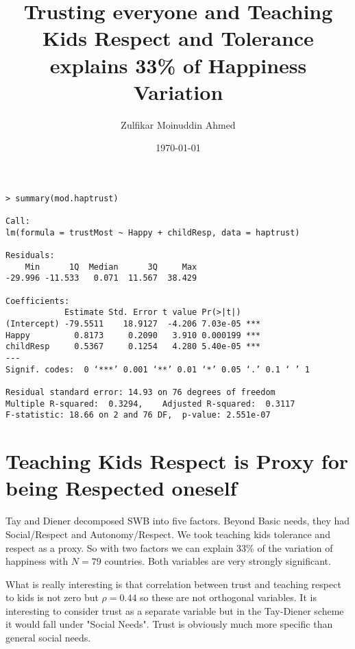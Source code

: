 \documentclass{amsart}
\title{Trusting everyone and Teaching Kids Respect and Tolerance explains 33\% of Happiness Variation}
\author{Zulfikar Moinuddin Ahmed}
\date{\today}
\begin{document}
\maketitle

\begin{verbatim}
> summary(mod.haptrust)

Call:
lm(formula = trustMost ~ Happy + childResp, data = haptrust)

Residuals:
    Min      1Q  Median      3Q     Max 
-29.996 -11.533   0.071  11.567  38.429 

Coefficients:
            Estimate Std. Error t value Pr(>|t|)    
(Intercept) -79.5511    18.9127  -4.206 7.03e-05 ***
Happy         0.8173     0.2090   3.910 0.000199 ***
childResp     0.5367     0.1254   4.280 5.40e-05 ***
---
Signif. codes:  0 ‘***’ 0.001 ‘**’ 0.01 ‘*’ 0.05 ‘.’ 0.1 ‘ ’ 1

Residual standard error: 14.93 on 76 degrees of freedom
Multiple R-squared:  0.3294,	Adjusted R-squared:  0.3117 
F-statistic: 18.66 on 2 and 76 DF,  p-value: 2.551e-07
\end{verbatim}

\section{Teaching Kids Respect is Proxy for being Respected oneself}

Tay and Diener decomposed SWB into five factors.  Beyond Basic needs, they had Social/Respect and Autonomy/Respect.  We took teaching kids tolerance and respect as a proxy.  So with two factors we can explain 33\% of the variation of happiness with $N=79$ countries.  Both variables are very strongly significant.

What is really interesting is that correlation between trust and teaching respect to kids is not zero but $\rho=0.44$ so these are not orthogonal variables.  It is interesting to consider trust as a separate variable but in the Tay-Diener scheme it would fall under "Social Needs".  Trust is obviously much more specific than general social needs.  
\end{document}
